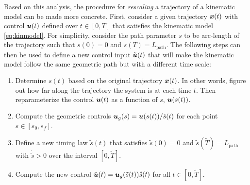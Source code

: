 Based on this analysis, the procedure for \textit{rescaling} a trajectory of a kinematic model can be made more concrete. First, consider a given trajectory $\bm{x}(t)$ with control $\bm{u}(t)$ defined over $t \in [0,T]$ that satisfies the kinematic model \eqref{eq:kinmodel}. For simplicity, consider the path parameter $s$ to be arc-length of the trajectory such that $s(0) = 0$ and $s(T) = L_{\text{path}}$.
The following steps can then be used to define a new control input $\tilde{\bm{u}}(t)$ that will make the kinematic model follow the same geometric path but with a different time scale:
\begin{enumerate}
\item Determine $s(t)$ based on the original trajectory $\bm{x}(t)$. In other words, figure out how far along the trajectory the system is at each time $t$. Then reparameterize the control $\bm{u}(t)$ as a function of $s$, $\bm{u}(s(t))$. 
\item Compute the geometric controls $\bm{u}_g(s) = \bm{u}(s(t))/\dot{s}(t)$ for each point $s \in [s_0, s_f]$.
\item Define a new timing law $\tilde{s}(t)$ that satisfies $\tilde{s}(0) = 0$ and $\tilde{s}(\tilde{T}) = L_{\text{path}}$ with $\dot{\tilde{s}} > 0$ over the interval $[0, \tilde{T}]$.
\item Compute the new control $\tilde{\bm{u}}(t) = \bm{u}_g(\tilde{s}(t)) \dot{\tilde{s}}(t)$ for all $t \in [0, \tilde{T}]$.
\end{enumerate}


